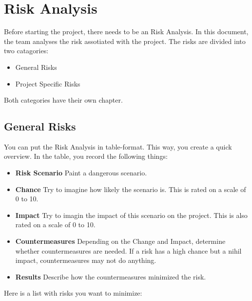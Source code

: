 \documentclass[10pt]{report}
\begin{document}
\newpage

\section{Risk Analysis}

Before starting the project, there needs to be an Risk Analysis. In this document, the team analyses the risk assotiated with the project. The risks are divided into two catagories:

\begin{itemize}
	\item General Risks
	\item Project Specific Risks
\end{itemize}

Both categories have their own chapter.

\subsection{General Risks}

You can put the Risk Analysis in table-format. This way, you create a quick overview. In the table, you record the following things:

\begin{itemize}
	\item \textbf{Risk Scenario} Paint a dangerous scenario.
	\item \textbf{Chance} Try to imagine how likely the scenario is. This is rated on a scale of 0 to 10.
	\item \textbf{Impact} Try to imagin the impact of this scenario on the project. This is also rated on a scale of 0 to 10.  
	\item \textbf{Countermeasures} Depending on the Change and Impact, determine whether countermeasures are needed. If a risk has a high chance but a nihil impact, countermeasures may not do anything.
	\item \textbf{Results} Describe how the countermeasures minimized the risk.  
\end{itemize}

Here is a list with risks you want to minimize:
\end{document}
